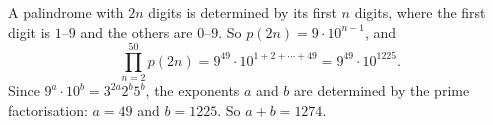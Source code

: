 A palindrome with $2n$ digits is determined by its first $n$ digits, where the first digit is $1$--$9$ and the others are $0$--$9$. So $p(2n)=9\cdot10^{n-1}$, and
\[\prod_{n=2}^{50}p(2n)=9^{49}\cdot10^{1+2+\cdots+49}=9^{49}\cdot10^{1225}.\]
Since $9^a\cdot10^b=3^{2a}2^b5^b$, the exponents $a$ and $b$ are determined by the prime factorisation: $a=49$ and $b=1225$. So $a+b=\boxed{1274}$.
